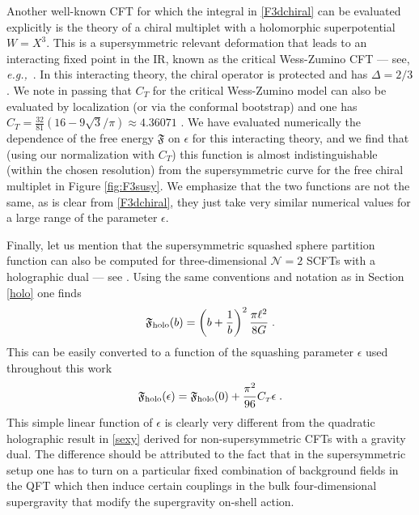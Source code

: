 \documentclass[12pt]{article}
\numberwithin{equation}{section}
\newcommand{\ssc}{\scriptscriptstyle}
\newcommand{\eg}{{\it e.g.,}\ }
\newcommand{\ctt}{C_{\ssc T}}
\begin{document}
Another well-known CFT for which the integral in \eqref{F3dchiral} can be evaluated explicitly is the theory of a chiral multiplet with a holomorphic superpotential $W=X^3$. This is a supersymmetric relevant deformation that leads to an interacting fixed point in the IR, known as the critical Wess-Zumino CFT --- see, \eg \cite{Bobev:2015jxa}. In this interacting theory, the chiral operator is protected and has $\Delta=2/3$. We note in passing that $\ctt$ for the critical Wess-Zumino model can also be evaluated by localization (or via the conformal bootstrap) and one has $\ctt=\frac{32}{81}\left(16-9\sqrt{3}/\pi\right)\approx 4.36071$ \cite{Nishioka:2013gza,Bobev:2015jxa,Witczak-Krempa:2015jca}. We have evaluated numerically the dependence of the free energy $\mathfrak{F}$ on $\epsilon$ for this interacting theory, and we find that (using our normalization with $\ctt$) this function is almost indistinguishable (within the chosen resolution) from the supersymmetric curve for the free chiral multiplet in Figure \ref{fig:F3susy}. We emphasize that the two functions are not the same, as is clear from \eqref{F3dchiral}, they just take very similar numerical values for a large range of the parameter $\epsilon$.



Finally, let us mention that the supersymmetric squashed sphere partition function can also be computed for three-dimensional $\mathcal{N}=2$ SCFTs with a holographic dual --- see \cite{Imamura:2011wg,Martelli:2011fu}. Using the same conventions and notation as in Section \ref{holo} one finds
%
\begin{equation}
\mathfrak{F}_{\rm holo}(b) = \left(b+\frac{1}{b}\right)^2 \frac{\pi\ell^2}{8G}\;.
\end{equation}
%
This can be easily converted to a function of the squashing parameter $\epsilon$ used throughout this work
%
\begin{equation}\label{Fholosusy}
\mathfrak{F}_{\rm holo}(\epsilon) =  \mathfrak{F}_{\rm holo}(0)+\frac{\pi^2}{96} \ctt \epsilon\;.
\end{equation}
%
This simple linear function of $\epsilon$ is clearly very different from the quadratic holographic result in \eqref{sexy} derived for non-supersymmetric CFTs with a gravity dual. The difference should be attributed to the fact that in the supersymmetric setup one has to turn on a particular fixed combination of background fields in the QFT which then induce certain couplings in the bulk four-dimensional supergravity that modify the supergravity on-shell action.
\end{document}
